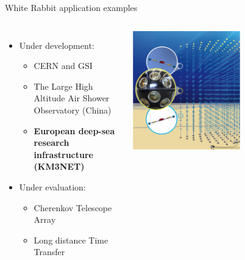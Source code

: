 \documentclass[compress, red]{beamer}
\begin{document}
\begin{frame}{White Rabbit application examples}
\begin{columns}[c]
    \begin{itemize}
      \item Under development:
      \begin{itemize}
	\item CERN and GSI
	\item The Large High Altitude Air Shower Observatory (China)
	\item \textbf{European deep-sea research infrastructure (KM3NET)} 
      \end{itemize}         	
      \item Under evaluation:
      \begin{itemize}
	\item Cherenkov Telescope Array
	\item Long distance Time Transfer
      \end{itemize}         	
    \end{itemize}    
    \begin{center}
      \includegraphics[width=0.6\textwidth]{../../figures/applications/KM3NeT.pdf}
      \end{center}
\end{columns}
\end{frame}
\end{document}
